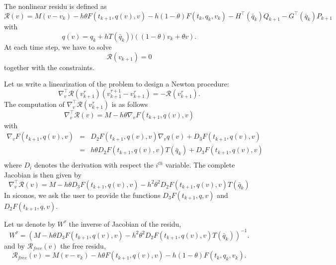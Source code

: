 The nonlinear residu is defined as
\begin{equation}
  \label{eq:Moreau--Jean-theta--nearly-residu}
  \mathcal R(v) =  M(v-v_k) - h  \theta F(t_{k+1}, q(v),v) - h (1- \theta) F(t_{k}, q_{k},v_{k}) - H^\top(\bar q_k) Q_{k+1} - G^\top(\bar q_k) P_{k+1}
\end{equation}
with
\begin{equation}
  \label{eq:Moreau--Jean-theta--nearly-residu1}
  q(v) = q_{k} + h T(\bar q_k)) ((1-\theta) v_k + \theta v).
\end{equation}
At each time step, we have to solve
\begin{equation}
  \label{eq:Moreau--Jean-theta--nearly-residu2}
  \mathcal R(v_{k+1}) =  0
\end{equation}
together with the constraints.

Let us write a linearization of the problem to design a Newton procedure:
\begin{equation}
  \label{eq:Moreau--Jean-theta--nearly-residu3}
  \nabla^\top_v \mathcal R(v^{\tau}_{k+1})(v^{\tau+1}_{k+1}-v^{\tau}_{k+1}) = -  \mathcal R(v^{\tau}_{k+1}).
\end{equation}
The computation of $ \nabla^\top_v \mathcal R(v^{\tau}_{k+1})$ is as follows
\begin{equation}
  \label{eq:1}
  \nabla^\top_v \mathcal R(v) = M - h \theta \nabla_v F(t_{k+1}, q(v),v)
\end{equation}
with
\begin{equation}
  \label{eq:6}
  \begin{array}{lcl}
    \nabla_v F(t_{k+1}, q(v),v) &=& D_2 F(t_{k+1}, q(v),v) \nabla_v q(v) + D_3 F(t_{k+1}, q(v),v) \\
                                &=& h \theta D_2 F(t_{k+1}, q(v),v) T(\bar q_k) + D_3 F(t_{k+1}, q(v),v) \\
  \end{array}
\end{equation}
where $D_i$ denotes the derivation with respect the $i^{th}$ variable. The complete Jacobian is then given by
\begin{equation}
  \label{eq:7}
  \nabla^\top_v \mathcal R(v) = M - h \theta D_3 F(t_{k+1}, q(v),v) - h^2 \theta^2 D_2 F(t_{k+1}, q(v),v) T(\bar q_k)
\end{equation}
In siconos, we ask the user to provide the functions $D_3 F(t_{k+1}, q ,v )$ and $D_2 F(t_{k+1}, q,v)$.

Let us denote by $W^{\tau}$ the inverse of  Jacobian of the residu,
\begin{equation}
  \label{eq:11}
  W^{\tau} = (M - h \theta D_3 F(t_{k+1}, q(v),v) - h^2 \theta^2 D_2 F(t_{k+1}, q(v),v) T(\bar q_k))^{-1}.
\end{equation}
and by $\mathcal R_{free}(v)$ the free residu,
\begin{equation}
  \label{eq:12}
  \mathcal R_{free}(v) =  M(v-v_k) - h  \theta F(t_{k+1}, q(v),v) - h (1- \theta) F(t_{k}, q_{k},v_{k}).
\end{equation}

